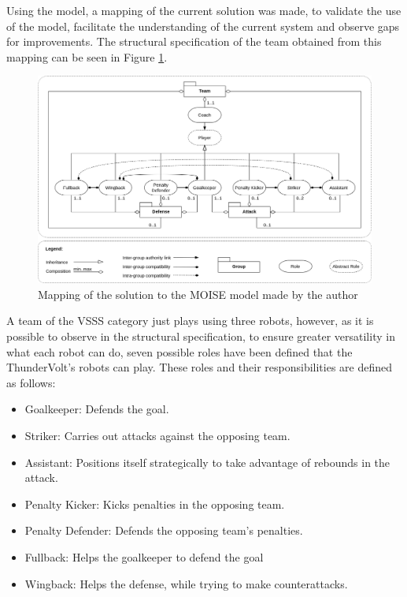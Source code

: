 Using the \MOISEp model, a mapping of the current solution was made, to validate the use of the model, facilitate the understanding of the current system and observe gaps for improvements. The structural specification of the team obtained from this mapping can be seen in Figure \ref{fig:moise_mapping}.

\begin{figure}[!ht]
    \centering
    \includegraphics[width=\linewidth]{chapters/target_system/images/ThunderVolt Moise-Structural Specification.png}
    \caption{Mapping of the solution to the MOISE model made by the author}
    \label{fig:moise_mapping}
\end{figure}

A team of the VSSS category just plays using three robots, however, as it is possible to observe in the structural specification, to ensure greater versatility in what each robot can do, seven possible roles have been defined that the ThunderVolt's robots can play. These roles and their responsibilities are defined as follows:

\begin{itemize}
    \item Goalkeeper: Defends the goal.
    \item Striker: Carries out attacks against the opposing team.
    \item Assistant: Positions itself strategically to take advantage of rebounds in the attack.
    \item Penalty Kicker: Kicks penalties in the opposing team.
    \item Penalty Defender: Defends the opposing team's penalties.
    \item Fullback: Helps the goalkeeper to defend the goal
    \item Wingback: Helps the defense, while trying to make counterattacks.
\end{itemize}

